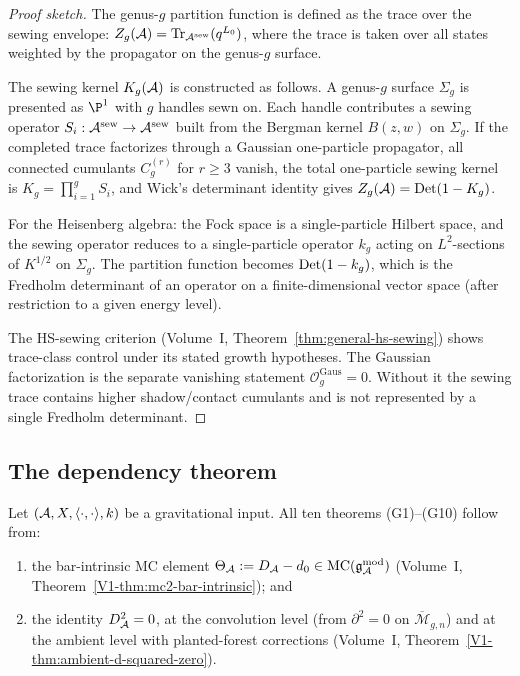 \begin{proof}[Proof sketch]
The genus-$g$ partition function is defined as the trace over the
sewing envelope:
$Z_g(\mathcal{A}) = \operatorname{Tr}_{\mathcal{A}^{\mathrm{sew}}}(q^{L_0})$, where the trace
is taken over all states weighted by the propagator on the genus-$g$
surface.

The sewing kernel \(K_g(\mathcal{A})\) is constructed as follows. A genus-$g$
surface $\Sigma_g$ is presented as $\P^1$ with $g$ handles sewn on.
Each handle contributes a sewing operator
$S_i: \mathcal{A}^{\mathrm{sew}} \to \mathcal{A}^{\mathrm{sew}}$ built from the
Bergman kernel $B(z,w)$ on $\Sigma_g$. If the completed trace
factorizes through a Gaussian one-particle propagator, all connected
cumulants \(C^{(r)}_g\) for \(r\ge3\) vanish, the total one-particle
sewing kernel is \(K_g=\prod_{i=1}^{g}S_i\), and Wick's determinant
identity gives \(Z_g(\mathcal{A})=\operatorname{Det}(1-K_g)\).

For the Heisenberg algebra: the Fock space is a single-particle
Hilbert space, and the sewing operator reduces to a single-particle
operator $k_g$ acting on $L^2$-sections of $K^{1/2}$ on $\Sigma_g$.
The partition function becomes $\operatorname{Det}(1 - k_g)$, which is the
Fredholm determinant of an operator on a finite-dimensional
vector space (after restriction to a given energy level).

The HS-sewing criterion (Volume~I, Theorem~\ref{thm:general-hs-sewing})
shows trace-class control under its stated growth hypotheses. The
Gaussian factorization is the separate vanishing statement
\(\mathcal O^{\mathrm{Gaus}}_g=0\). Without it the sewing trace
contains higher shadow/contact cumulants and is not represented by a
single Fredholm determinant.
\end{proof}


\subsection{The dependency theorem}

\begin{theorem}
\label{thm:thqg-dependency}
Let $(\mathcal{A}, X, \langle\cdot,\cdot\rangle, k)$ be a gravitational input.
All ten theorems \textup{(G1)--(G10)} follow from:
\begin{enumerate}[label=\textup{(\roman*)}]
\item the bar-intrinsic MC element $\Theta_{\mathcal{A}} := D_{\mathcal{A}} - d_0 \in \mathrm{MC}(\mathfrak{g}_{\mathcal{A}}^{\mathrm{mod}})$
 (Volume~I, Theorem~\ref*{V1-thm:mc2-bar-intrinsic}); and
\item the identity $D_{\mathcal{A}}^2 = 0$, at the convolution level
 (from $\partial^2 = 0$ on $\overline{\mathcal{M}}_{g,n}$)
 and at the ambient level with planted-forest corrections
 (Volume~I, Theorem~\ref{V1-thm:ambient-d-squared-zero}).
\end{enumerate}
\end{theorem}

